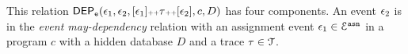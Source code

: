 This relation
$\mathsf{DEP_{\mathtt{e}}}(\mathtt{\epsilon}_1, \mathtt{\epsilon}_2, [\mathtt{\epsilon}_1 ] {\scriptscriptstyle ++} \mathtt{\tau} {\scriptscriptstyle ++} [\mathtt{\epsilon}_2], c, D)$ has four components.
An event $\mathtt{\epsilon}_2$ is in the \emph{event may-dependency} relation with an assignment
event $\mathtt{\epsilon}_1 \in \mathcal{E}^{\mathtt{{asn}}}$ in a program ${c}$
with a hidden database $D$ and a trace $\mathtt{\tau} \in \mathcal{T}$.
